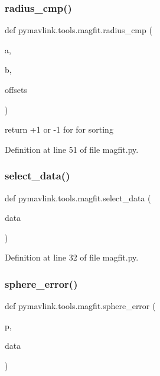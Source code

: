 \subsubsection{\texorpdfstring{radius\_cmp()}{radius\_cmp()}}
{\footnotesize\ttfamily def pymavlink.\+tools.\+magfit.\+radius\+\_\+cmp (\begin{DoxyParamCaption}\item[{}]{a,  }\item[{}]{b,  }\item[{}]{offsets }\end{DoxyParamCaption})}

\begin{DoxyVerb}return +1 or -1 for for sorting\end{DoxyVerb}
 

Definition at line 51 of file magfit.\+py.

\mbox{\label{namespacepymavlink_1_1tools_1_1magfit_ae5cfb18d0ec8a01c11dd00ef0a2d8a40}} 
\subsubsection{\texorpdfstring{select\_data()}{select\_data()}}
{\footnotesize\ttfamily def pymavlink.\+tools.\+magfit.\+select\+\_\+data (\begin{DoxyParamCaption}\item[{}]{data }\end{DoxyParamCaption})}



Definition at line 32 of file magfit.\+py.

\mbox{\label{namespacepymavlink_1_1tools_1_1magfit_ae6c075abeaba6f6da5ea3023a1f136da}} 
\subsubsection{\texorpdfstring{sphere\_error()}{sphere\_error()}}
{\footnotesize\ttfamily def pymavlink.\+tools.\+magfit.\+sphere\+\_\+error (\begin{DoxyParamCaption}\item[{}]{p,  }\item[{}]{data }\end{DoxyParamCaption})}



